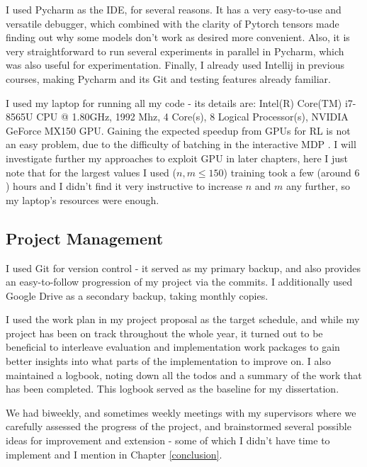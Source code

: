I used Pycharm as the IDE, for several reasons. It has a very easy-to-use and versatile debugger, which combined with the clarity of Pytorch tensors made finding out why some models don't work as desired more convenient. Also, it is very straightforward to run several experiments in parallel in Pycharm, which was also useful for experimentation. Finally, I already used Intellij in previous courses, making Pycharm and its Git and testing features already familiar.

I used my laptop for running all my code - its details are: Intel(R) Core(TM) i7-8565U CPU @ 1.80GHz, 1992 Mhz, 4 Core(s), 8 Logical Processor(s), NVIDIA GeForce MX150 GPU. Gaining the expected speedup from GPUs for RL is not an easy problem, due to the difficulty of batching in the interactive MDP \cite{stooke2018gpudeepRL}. I will investigate further my approaches to exploit GPU in later chapters, here I just note that for the largest values I used ($n,m\leq 150$) training took a few (around $6$) hours and I didn't find it very instructive to increase $n$ and $m$ any further, so my laptop's resources were enough.


\subsection{Project Management}


I used Git for version control - it served as my primary backup, and also provides an easy-to-follow progression of my project via the commits. I additionally used Google Drive as a secondary backup, taking monthly copies. 

I used the work plan in my project proposal as the target schedule, and while my project has been on track throughout the whole year, it turned out to be beneficial to interleave evaluation and implementation work packages to gain better insights into what parts of the implementation to improve on. I also maintained a logbook, noting down all the todos and a summary of the work that has been completed. This logbook served as the baseline for my dissertation.

We had biweekly, and sometimes weekly meetings with my supervisors where we carefully assessed the progress of the project, and brainstormed several possible ideas for improvement and extension - some of which I didn't have time to implement and I mention in Chapter \ref{conclusion}.

